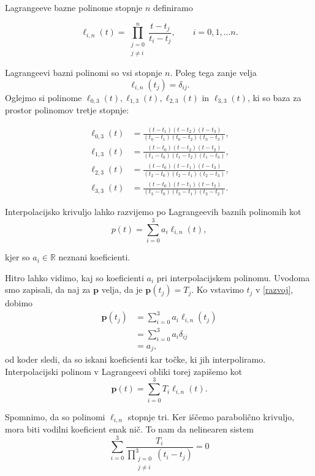 \documentclass[mat1]{fmfdelo}
\newcommand{\R}{\mathbb R}
\begin{document}
\begin{definicija}
Lagrangeeve bazne polinome stopnje $n$ definiramo

$$ \ell_{i,n}(t) = \prod_{\substack{j=0 \\ j \neq i}}^{n} \frac{t - t_j}{t_i - t_j} , \qquad i = 0, 1, \ldots n.$$	
\end{definicija}

Lagrangeevi bazni polinomi so vsi stopnje $n$. Poleg tega zanje velja $$\ell_{i,n}(t_j) = \delta_{ij}.$$
Oglejmo si polinome $ \ell_{0,3}(t), \ell_{1,3}(t), \ell_{2,3}(t)$ in $ \ell_{3,3}(t) $, ki so baza za prostor polinomov tretje stopnje:

\begin{align*}
	\ell_{0,3}(t) &= \frac{(t - t_1)(t - t_2)(t - t_3)}{(t_0 - t_1)(t_0 - t_2)(t_0 - t_3)}, \\
	\ell_{1,3}(t) &= \frac{(t - t_0)(t - t_2)(t - t_2)}{(t_1 - t_0)(t_1 - t_2)(t_1 - t_3)}, \\
	\ell_{2,3}(t) &= \frac{(t - t_0)(t - t_1)(t - t_3)}{(t_2 - t_0)(t_2 - t_1)(t_2 - t_3)}, \\
	\ell_{3,3}(t) &= \frac{(t - t_0)(t - t_1)(t - t_2)}{(t_3 - t_0)(t_3 - t_1)(t_3 - t_2)}. 	
\end{align*}

Interpolacijsko krivuljo lahko razvijemo po Lagrangeevih baznih polinomih kot 
\begin{equation}\label{razvoj}
p(t) = \sum_{i=0}^{3} a_i \ell_{i,n}(t),
\end{equation}

kjer so $a_i \in \R$ neznani koeficienti.

Hitro lahko vidimo, kaj so koeficienti $a_i$ pri interpolacijskem polinomu. Uvodoma smo zapisali, da naj za $\textbf{p}$ velja, da je $\textbf{p}(t_j) = T_j$. Ko vstavimo $t_j$ v \eqref{razvoj}, dobimo
\begin{align*}
\textbf{p}(t_j) &=  \sum_{i=0}^{3} a_i \ell_{i,n}(t_j) \\
	 &= \sum_{i=0}^{3} a_i \delta_{ij} \\
	&= a_j
,\end{align*}
od koder sledi, da so iskani koeficienti kar točke, ki jih interpoliramo. Interpolacijski polinom v Lagrangeevi obliki torej zapišemo kot 
$$\textbf{p}(t) = \sum_{i=0}^{3} T_i \ell_{i,n}(t).$$

Spomnimo, da so polinomi $\ell_{i,n}$ stopnje tri. Ker iščemo parabolično krivuljo, mora biti vodilni koeficient enak nič. To nam da nelinearen sistem
\begin{equation}\label{vodkoef}
\sum_{i = 0}^{3} \frac{T_i}{\prod_{\substack{j = 0 \\ j \neq i}}^3(t_i - t_j)} = 0
\end{equation}
\end{document}
